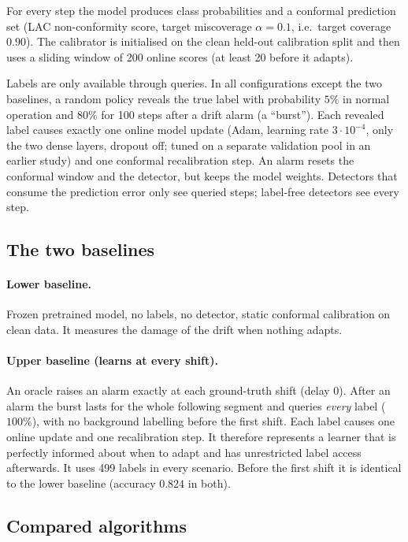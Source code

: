 \documentclass[11pt,a4paper]{article}
\begin{document}
For every step the model produces class probabilities and a conformal prediction set (LAC non-conformity score,
target miscoverage $\alpha=0.1$, i.e.\ target coverage $0.90$). The calibrator is initialised on the clean held-out
calibration split and then uses a sliding window of 200 online scores (at least 20 before it adapts).

Labels are only available through queries. In all configurations except the two baselines, a random policy
reveals the true label with probability $5\%$ in normal operation and $80\%$ for 100 steps after a drift alarm (a ``burst'').
Each revealed label causes exactly one online model update (Adam, learning rate $3\cdot10^{-4}$, only the two dense layers,
dropout off; tuned on a separate validation pool in an earlier study) and one conformal recalibration step.
An alarm resets the conformal window and the detector, but keeps the model weights. Detectors that consume the prediction error only see
queried steps; label-free detectors see every step.

\subsection{The two baselines}

\paragraph{Lower baseline.} Frozen pretrained model, no labels, no detector, static conformal calibration on clean data.
It measures the damage of the drift when nothing adapts.

\paragraph{Upper baseline (learns at every shift).} An oracle raises an alarm exactly at each ground-truth shift (delay 0). After an alarm the burst lasts for
the whole following segment and queries \emph{every} label ($100\%$), with no background labelling before the first shift.
Each label causes one online update and one recalibration step. It therefore represents a learner that is perfectly informed
about when to adapt and has unrestricted label access afterwards. It uses 499 labels in every scenario.
Before the first shift it is identical to the lower baseline (accuracy $0.824$ in both).

\subsection{Compared algorithms}
\end{document}
